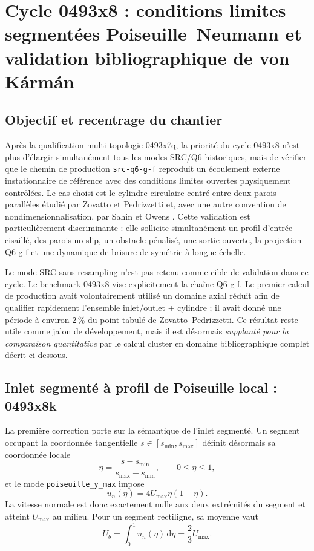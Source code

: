 \documentclass[11pt,a4paper]{article}
\begin{document}
\section{Cycle 0493x8 : conditions limites segmentées Poiseuille--Neumann et validation bibliographique de von Kármán}
\label{sec:x8-vk-validation}

\subsection{Objectif et recentrage du chantier}

Après la qualification multi-topologie 0493x7q, la priorité du cycle 0493x8 n'est plus d'élargir simultanément tous les modes SRC/Q6 historiques, mais de vérifier que le chemin de production \texttt{src-q6-g-f} reproduit un écoulement externe instationnaire de référence avec des conditions limites ouvertes physiquement contrôlées. Le cas choisi est le cylindre circulaire centré entre deux parois parallèles étudié par Zovatto et Pedrizzetti \cite{ZovattoPedrizzetti2001} et, avec une autre convention de nondimensionnalisation, par Sahin et Owens \cite{SahinOwens2004}. Cette validation est particulièrement discriminante : elle sollicite simultanément un profil d'entrée cisaillé, des parois no-slip, un obstacle pénalisé, une sortie ouverte, la projection Q6-g-f et une dynamique de brisure de symétrie à longue échelle.

Le mode SRC sans resampling n'est pas retenu comme cible de validation dans ce cycle. Le benchmark 0493x8 vise explicitement la chaîne Q6-g-f. Le premier calcul de production avait volontairement utilisé un domaine axial réduit afin de qualifier rapidement l'ensemble inlet/outlet + cylindre ; il avait donné une période à environ $2\,\%$ du point tabulé de Zovatto--Pedrizzetti. Ce résultat reste utile comme jalon de développement, mais il est désormais \emph{supplanté pour la comparaison quantitative} par le calcul cluster en domaine bibliographique complet décrit ci-dessous.

\subsection{Inlet segmenté à profil de Poiseuille local : 0493x8k}

La première correction porte sur la sémantique de l'inlet segmenté. Un segment occupant la coordonnée tangentielle $s\in[s_{\min},s_{\max}]$ définit désormais sa coordonnée locale
\begin{equation}
  \eta=\frac{s-s_{\min}}{s_{\max}-s_{\min}},
  \qquad 0\leq \eta\leq 1,
\end{equation}
et le mode \texttt{poiseuille\_y\_max} impose
\begin{equation}
  u_n(\eta)=4U_{\max}\eta(1-\eta).
  \label{eq:x8-local-poiseuille}
\end{equation}
La vitesse normale est donc exactement nulle aux deux extrémités du segment et atteint $U_{\max}$ au milieu. Pour un segment rectiligne, sa moyenne vaut
\begin{equation}
  U_b=\int_0^1 u_n(\eta)\,\mathrm d\eta=\frac{2}{3}U_{\max}.
  \label{eq:x8-poiseuille-mean}
\end{equation}
\end{document}
